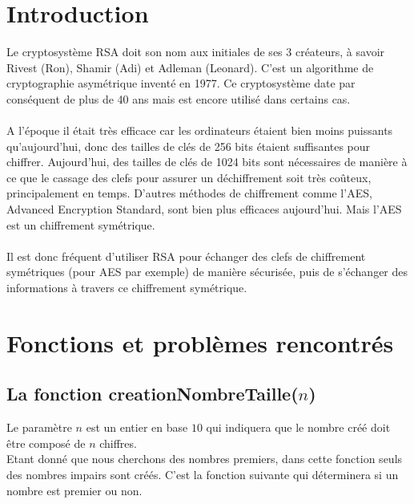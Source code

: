 \documentclass[12pt]{article}
\theoremstyle{definition}
\begin{document}
\tableofcontents
\pagebreak

\section*{Introduction}
Le cryptosystème RSA doit son nom aux initiales de ses 3 créateurs, à savoir Rivest (Ron), Shamir (Adi) et Adleman (Leonard). C'est un algorithme de cryptographie asymétrique inventé en 1977. Ce cryptosystème date par conséquent de plus de 40 ans mais est encore utilisé dans certains cas.\\\\
A l'époque il était très efficace car les ordinateurs étaient bien moins puissants qu'aujourd'hui, donc des tailles de clés de 256 bits étaient suffisantes pour chiffrer. Aujourd'hui, des tailles de clés de 1024 bits sont nécessaires de manière à ce que le cassage des clefs pour assurer un déchiffrement soit très coûteux, principalement en temps. D'autres méthodes de chiffrement comme l'AES, Advanced Encryption Standard, sont bien plus efficaces aujourd'hui. Mais l'AES est un chiffrement symétrique.\\\\
Il est donc fréquent d'utiliser RSA pour échanger des clefs de chiffrement symétriques (pour AES par exemple) de manière sécurisée, puis de s'échanger des informations à travers ce chiffrement symétrique.
\vfill \eject

\section{Fonctions et problèmes rencontrés}
\vspace{12pt}
	\subsection{La fonction \textsf{creationNombreTaille($n$)}}
	Le paramètre $n$ est un entier en base $10$ qui indiquera que le nombre créé doit être composé de $n$ chiffres.\\
	Etant donné que nous cherchons des nombres premiers, dans cette fonction seuls des nombres impairs sont créés. C'est la fonction suivante qui déterminera si un nombre est premier ou non.	
\end{document}
